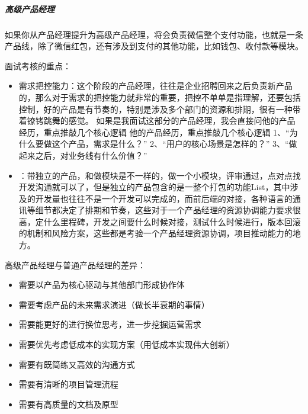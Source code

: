 \documentclass[letterpaper,10pt,english]{sphinxmanual}
\begin{document}
\subparagraph{高级产品经理}
\label{\detokenize{chapter_introduction/career_path:id12}}
如果你从产品经理提升为高级产品经理，将会负责微信整个支付功能，也就是一条产品线，除了微信红包，还有涉及到支付的其他功能，比如钱包、收付款等模块。

面试考核的重点：
\begin{itemize}
\item {} 
需求把控能力：这个阶段的产品经理，往往是企业招聘回来之后负责新产品的，那么对于需求的把控能力就非常的重要，把控不单单是指理解，还要包括控制，好的产品是有节奏的，特别是涉及多个部门的资源和排期，很有一种带着镣铐跳舞的感觉。
如果是我面试这部分的产品经理，我会直接问他的产品经历，重点推敲几个核心逻辑
他的产品经历，重点推敲几个核心逻辑
1、“为什么要做这个产品，需求是什么？” 2、“用户的核心场景是怎样的？”
3、“做起来之后，对业务线有什么价值？”

\item {} 
：带独立的产品，和做模块是不一样的，做一个小模块，评审通过，点对点找开发沟通就可以了，但是独立的产品包含的是一整个打包的功能List，其中涉及的开发量也往往不是一个开发可以完成的，而前后端的对接，各种语言的通讯等细节都决定了排期和节奏，这些对于一个产品经理的资源协调能力要求很高，定什么里程碑，开发之间要什么时候对接，测试什么时候进行，版本回滚的机制和风险方案，这些都是考验一个产品经理资源协调，项目推动能力的地方。

\end{itemize}

高级产品经理与普通产品经理的差异：
\begin{itemize}
\item {} 
需要以产品为核心驱动与其他部门形成协作体

\item {} 
需要考虑产品的未来需求演进（做长半衰期的事情）

\item {} 
需要能更好的进行换位思考，进一步挖掘运营需求

\item {} 
需要优先考虑低成本的实现方案（用低成本实现伟大创新）

\item {} 
需要有既简练又高效的沟通方式

\item {} 
需要有清晰的项目管理流程

\item {} 
需要有高质量的文档及原型

\end{itemize}
\end{document}
